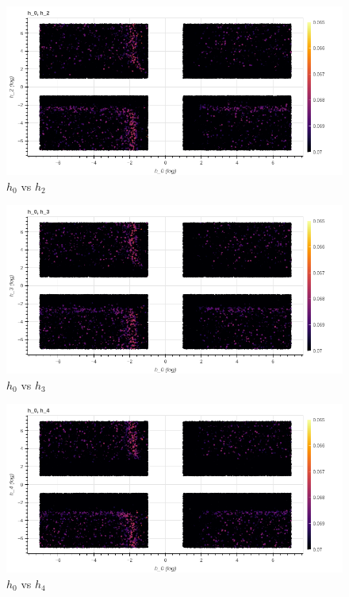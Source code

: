 \documentclass[openany]{article}
\begin{document}
\newpage 

\begin{figure}[!h]
    \centering
    \includegraphics[width=\textwidth]{h2.png}
    \caption{\( h_0\) vs \(h_2\)}
    \label{fig:my_label}
\end{figure}



\begin{figure}[!h]
    \centering
    \includegraphics[width=\textwidth]{h3.png}
    \caption{\( h_0\) vs \(h_3\)}
    \label{fig:my_label}
\end{figure}

\newpage 

\begin{figure}[!h]
    \centering
    \includegraphics[width=\textwidth]{h4.png}
    \caption{\( h_0\) vs \(h_4\)}
    \label{fig:my_label}
\end{figure}
\end{document}
